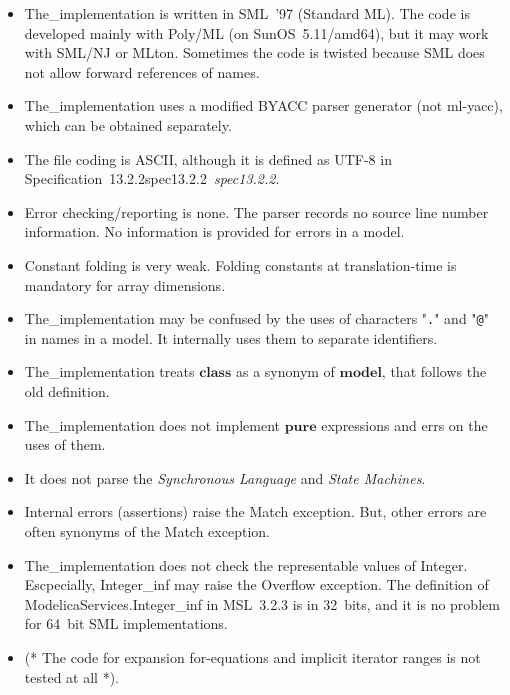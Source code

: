 \documentclass[10pt,b5paper]{article}
\def\specrefx#1#2{Specification~#1\ifx\relax#2\relax{}\else~{\it{}#2}\fi}
\def\specref#1{\specrefx{#1}{\csname spec#1\endcsname}}
\begin{document}
\begin{itemize}

\item The_implementation is written in SML~'97 (Standard ML).  The
code is developed mainly with Poly/ML (on SunOS~5.11/amd64), but it
may work with SML/NJ or MLton.  Sometimes the code is twisted because
SML does not allow forward references of names.

\item The_implementation uses a modified BYACC parser generator (not
ml-yacc), which can be obtained separately.

\item The file coding is ASCII, although it is defined as UTF-8 in
\specref{13.2.2}.

\item Error checking/reporting is none.  The parser records no source
line number information.  No information is provided for errors in a
model.

\item Constant folding is very weak.  Folding constants at
translation-time is mandatory for array dimensions.

\item The_implementation may be confused by the uses of characters
"{\tt{}.}" and "{\tt{}@}" in names in a model.  It internally uses
them to separate identifiers.

\item The_implementation treats $\mathbf{class}$ as a synonym of
$\mathbf{model}$, that follows the old definition.

\item The_implementation does not implement $\mathbf{pure}$
expressions and errs on the uses of them.

\item It does not parse the {\it{}Synchronous Language\/} and
{\it{}State Machines}.

\item Internal errors (assertions) raise the Match exception.  But,
other errors are often synonyms of the Match exception.

\item The_implementation does not check the representable values of
{Integer}.  Escpecially, {Integer\_inf} may raise the Overflow
exception.  The definition of {ModelicaServices.Integer\_inf} in
MSL~3.2.3 is in 32~bits, and it is no problem for 64~bit SML
implementations.

\item (* The code for expansion for-equations and implicit iterator
ranges is not tested at all *).

\end{itemize}
\end{document}
